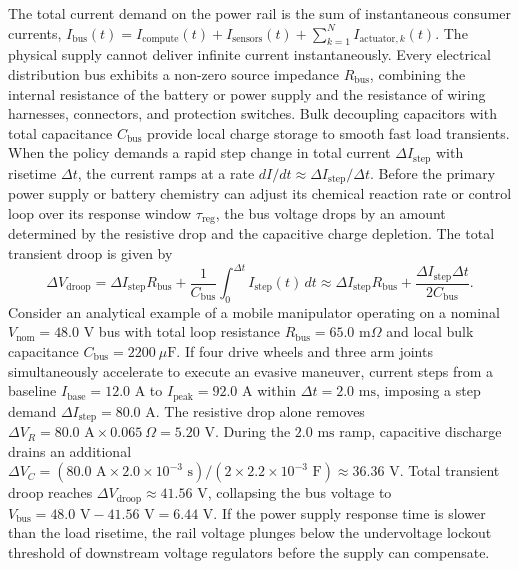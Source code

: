 \documentclass[
  letterpaper,
  DIV=11,
  numbers=noendperiod]{scrartcl}
\begin{document}
The total current demand on the power rail is the sum of instantaneous
consumer currents,
\(I_{\text{bus}}(t) = I_{\text{compute}}(t) + I_{\text{sensors}}(t) + \sum_{k=1}^N I_{\text{actuator},k}(t)\).
The physical supply cannot deliver infinite current instantaneously.
Every electrical distribution bus exhibits a non-zero source impedance
\(R_{\text{bus}}\), combining the internal resistance of the battery or
power supply and the resistance of wiring harnesses, connectors, and
protection switches. Bulk decoupling capacitors with total capacitance
\(C_{\text{bus}}\) provide local charge storage to smooth fast load
transients. When the policy demands a rapid step change in total current
\(\Delta I_{\text{step}}\) with risetime \(\Delta t\), the current ramps
at a rate \(dI/dt \approx \Delta I_{\text{step}} / \Delta t\). Before
the primary power supply or battery chemistry can adjust its chemical
reaction rate or control loop over its response window
\(\tau_{\text{reg}}\), the bus voltage drops by an amount determined by
the resistive drop and the capacitive charge depletion. The total
transient droop is given by
\[\Delta V_{\text{droop}} = \Delta I_{\text{step}} R_{\text{bus}} + \frac{1}{C_{\text{bus}}} \int_0^{\Delta t} I_{\text{step}}(t) \, dt \approx \Delta I_{\text{step}} R_{\text{bus}} + \frac{\Delta I_{\text{step}} \Delta t}{2 C_{\text{bus}}}.\]
Consider an analytical example of a mobile manipulator operating on a
nominal \(V_{\text{nom}} = 48.0\text{ V}\) bus with total loop
resistance \(R_{\text{bus}} = 65.0\text{ m}\Omega\) and local bulk
capacitance \(C_{\text{bus}} = 2200\ \mu\text{F}\). If four drive wheels
and three arm joints simultaneously accelerate to execute an evasive
maneuver, current steps from a baseline
\(I_{\text{base}} = 12.0\text{ A}\) to
\(I_{\text{peak}} = 92.0\text{ A}\) within \(\Delta t = 2.0\text{ ms}\),
imposing a step demand \(\Delta I_{\text{step}} = 80.0\text{ A}\). The
resistive drop alone removes
\(\Delta V_R = 80.0\text{ A} \times 0.065\ \Omega = 5.20\text{ V}\).
During the \(2.0\text{ ms}\) ramp, capacitive discharge drains an
additional
\(\Delta V_C = (80.0\text{ A} \times 2.0 \times 10^{-3}\text{ s}) / (2 \times 2.2 \times 10^{-3}\text{ F}) \approx 36.36\text{ V}\).
Total transient droop reaches
\(\Delta V_{\text{droop}} \approx 41.56\text{ V}\), collapsing the bus
voltage to
\(V_{\text{bus}} = 48.0\text{ V} - 41.56\text{ V} = 6.44\text{ V}\). If
the power supply response time is slower than the load risetime, the
rail voltage plunges below the undervoltage lockout threshold of
downstream voltage regulators before the supply can compensate.
\end{document}
